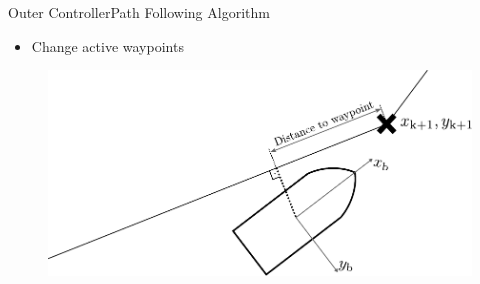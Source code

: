 \begin{frame}{Outer Controller}{Path Following Algorithm}
    \begin{itemize}
        \item Change active waypoints
    \end{itemize}
    \begin{figure}[H]
        \centering
        \includegraphics[width=0.6\linewidth]{figures/LOSalgorithmdistancewp}
    \end{figure}
\end{frame}

